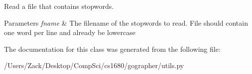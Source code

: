 Read a file that contains stopwords. 


\begin{DoxyParams}{Parameters}
{\em fname} & The filename of the stopwords to read. File should contain one word per line and already be lowercase \\
\hline
\end{DoxyParams}


The documentation for this class was generated from the following file\-:\begin{DoxyCompactItemize}
\item 
/\-Users/\-Zack/\-Desktop/\-Comp\-Sci/cs1680/gographer/utils.\-py\end{DoxyCompactItemize}

